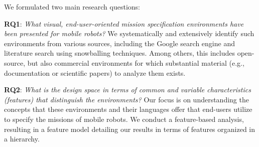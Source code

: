 

We formulated two main research questions:

\textbf{RQ1}: \textit{What visual, end-user-oriented mission specification environments have been presented for mobile robots?}
We systematically and extensively identify such environments from various sources, including the Google search engine and literature search using snowballing techniques. Among others, this includes open-source, but also commercial environments for which substantial material (e.g., documentation or scientific papers) to analyze them exists.

\textbf{RQ2}: \textit{What is the design space in terms of common and variable characteristics (features) that distinguish the environments?} Our focus is on understanding the concepts that these environments and their languages offer that end-users utilize to specify the missions of mobile robots. We conduct a feature-based analysis, resulting in a feature model detailing our results in terms of features organized in a hierarchy.


